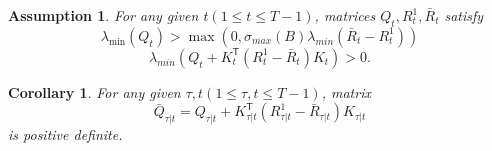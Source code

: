 \documentclass{article}
\newcommand{\transpose}{\mathsf{T}}
\newtheorem{assumption}{Assumption}
\newtheorem{corollary}{Corollary}
\begin{document}
\begin{assumption}\label{assumption:lowerQ}
    For any given $t(1\leq t \leq T-1)$, matrices $Q_{t}, R_{t}^{1}, \bar{R}_{t}$ satisfy
    \begin{equation}
        \lambda_{\min}(Q_{t}) > \max(0,\sigma_{max}(B)\lambda_{min}(\bar{R}_{t}-R_{t}^{1}))
    \end{equation}
    \begin{equation}
        \lambda_{min}(Q_{t}+K_{t}^{\transpose}(R_{t}^{1}-\bar{R}_{t})K_{t}) > 0.
    \end{equation}
\end{assumption}

\begin{corollary}
    For any given $\tau,t(1\leq \tau, t \leq T-1)$, matrix
    \begin{equation}
        \bar{Q}_{\tau|t} = Q_{\tau|t} + K_{\tau|t}^{\transpose}(R_{\tau|t}^{1} - \bar{R}_{\tau|t})K_{\tau|t}
    \end{equation}
    is positive definite.
\end{corollary}
\end{document}
